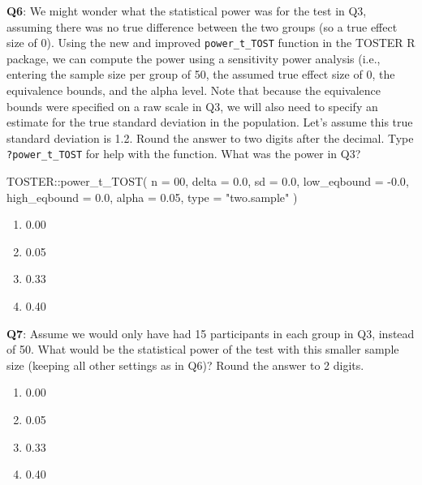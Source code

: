 \documentclass[
  oneside]{book}
\newenvironment{Shaded}{\begin{snugshade}}{\end{snugshade}}
\newcommand{\AttributeTok}[1]{\textcolor[rgb]{0.77,0.63,0.00}{#1}}
\newcommand{\DecValTok}[1]{\textcolor[rgb]{0.00,0.00,0.81}{#1}}
\newcommand{\FloatTok}[1]{\textcolor[rgb]{0.00,0.00,0.81}{#1}}
\newcommand{\FunctionTok}[1]{\textcolor[rgb]{0.00,0.00,0.00}{#1}}
\newcommand{\NormalTok}[1]{#1}
\newcommand{\SpecialCharTok}[1]{\textcolor[rgb]{0.00,0.00,0.00}{#1}}
\newcommand{\StringTok}[1]{\textcolor[rgb]{0.31,0.60,0.02}{#1}}
\providecommand{\tightlist}{%
  \setlength{\itemsep}{0pt}\setlength{\parskip}{0pt}}
\begin{document}
\textbf{Q6}: We might wonder what the statistical power was for the test in Q3, assuming there was no true difference between the two groups (so a true effect size of 0). Using the new and improved \texttt{power\_t\_TOST} function in the TOSTER R package, we can compute the power using a sensitivity power analysis (i.e., entering the sample size per group of 50, the assumed true effect size of 0, the equivalence bounds, and the alpha level. Note that because the equivalence bounds were specified on a raw scale in Q3, we will also need to specify an estimate for the true standard deviation in the population. Let's assume this true standard deviation is 1.2. Round the answer to two digits after the decimal. Type \texttt{?power\_t\_TOST} for help with the function. What was the power in Q3?

\begin{Shaded}
\begin{Highlighting}[]
\NormalTok{TOSTER}\SpecialCharTok{::}\FunctionTok{power\_t\_TOST}\NormalTok{(}
  \AttributeTok{n =} \DecValTok{00}\NormalTok{,}
  \AttributeTok{delta =} \FloatTok{0.0}\NormalTok{,}
  \AttributeTok{sd =} \FloatTok{0.0}\NormalTok{,}
  \AttributeTok{low\_eqbound =} \SpecialCharTok{{-}}\FloatTok{0.0}\NormalTok{,}
  \AttributeTok{high\_eqbound =} \FloatTok{0.0}\NormalTok{,}
  \AttributeTok{alpha =} \FloatTok{0.05}\NormalTok{,}
  \AttributeTok{type =} \StringTok{"two.sample"}
\NormalTok{)}
\end{Highlighting}
\end{Shaded}

\begin{enumerate}
\def\labelenumi{\Alph{enumi})}
\tightlist
\item
  0.00
\item
  0.05
\item
  0.33
\item
  0.40
\end{enumerate}

\textbf{Q7}: Assume we would only have had 15 participants in each group in Q3, instead of 50. What would be the statistical power of the test with this smaller sample size (keeping all other settings as in Q6)? Round the answer to 2 digits.

\begin{enumerate}
\def\labelenumi{\Alph{enumi})}
\tightlist
\item
  0.00
\item
  0.05
\item
  0.33
\item
  0.40
\end{enumerate}
\end{document}
